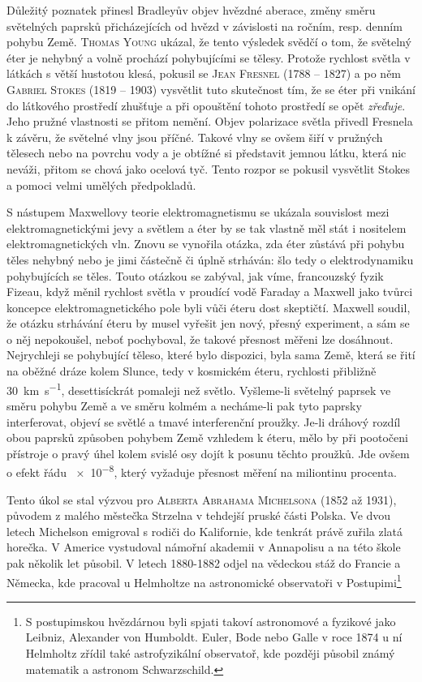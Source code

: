         Důležitý poznatek přinesl Bradleyův objev hvězdné aberace, změny směru světelných paprsků
        přicházejících od hvězd v závislosti na ročním, resp. denním pohybu Země. \textsc{Thomas
        Young} ukázal, že tento výsledek svědčí o tom, že světelný éter je nehybný a volně prochází
        pohybujícími se tělesy. Protože rychlost světla v látkách s větší hustotou klesá, pokusil se
        \textsc{Jean Fresnel} (1788 – 1827) a po něm \textsc{Gabriel Stokes} (1819 – 1903) vysvětlit
        tuto skutečnost tím, že se éter při vnikání do látkového prostředí zhušťuje a při opouštění
        tohoto prostředí se opět \emph{zřeďuje}. Jeho pružné vlastnosti se přitom nemění. Objev
        polarizace světla přivedl Fresnela k závěru, že světelné vlny jsou příčné. Takové vlny se
        ovšem šiří v pružných tělesech nebo na povrchu vody a je obtížné si představit jemnou látku,
        která nic neváži, přitom se chová jako ocelová tyč. Tento rozpor se pokusil vysvětlit Stokes
        a pomoci velmi umělých předpokladů.

      S nástupem Maxwellovy teorie elektromagnetismu se ukázala souvislost mezi elektromagnetickými
      jevy a světlem a éter by se tak vlastně měl stát i nositelem elektromagnetických vln. Znovu se
      vynořila otázka, zda éter zůstává při pohybu těles nehybný nebo je jimi částečně či úplně
      strháván: šlo tedy o elektrodynamiku pohybujících se těles. Touto otázkou se zabýval, jak
      víme, francouzský fyzik Fizeau, když měnil rychlost světla v proudící vodě Faraday a Maxwell
      jako tvůrci koncepce elektromagnetického pole byli vůči éteru dost skeptičtí. Maxwell soudil,
      že otázku strhávání éteru by musel vyřešit jen nový, přesný experiment, a sám se o něj
      nepokoušel, neboť pochyboval, že takové přesnost měřeni lze dosáhnout. Nejrychleji se
      pohybující těleso, které bylo dispozici, byla sama Země, která se řití na oběžné dráze kolem
      Slunce, tedy v kosmickém éteru, rychlosti přibližně \SI{30}{\km\per\s}, desettisíckrát
      pomaleji než světlo. Vyšleme-li světelný paprsek ve směru pohybu Země a ve směru kolmém a
      necháme-li pak tyto paprsky interferovat, objeví se světlé a tmavé interferenční proužky.
      Je-li dráhový rozdíl obou paprsků způsoben pohybem Země vzhledem k éteru, mělo by při
      pootočeni přístroje o pravý úhel kolem svislé osy dojít k posunu těchto proužků. Jde ovšem o
      efekt řádu \num{e-8}, který vyžaduje přesnost měření na miliontinu procenta. 

      Tento úkol se stal výzvou pro \textsc{Alberta Abrahama Michelsona} (1852 až 1931), původem z
      malého městečka Strzelna v tehdejší pruské části Polska. Ve dvou letech Michelson emigroval s
      rodiči do Kalifornie, kde tenkrát právě zuřila zlatá horečka. V Americe vystudoval námořní
      akademii v Annapolisu a na této škole pak několik let působil. V letech 1880-1882 odjel na
      vědeckou stáž do Francie a Německa, kde pracoval u Helmholtze na astronomické observatoři v
      Postupimi\footnote{ S postupimskou hvězdárnou byli spjati takoví astronomové a fyzikové jako
      Leibniz, Alexander von Humboldt. Euler, Bode nebo Galle v roce 1874 u ní Helmholtz zřídil také
      astrofyzikální observatoř, kde později působil známý matematik a astronom Schwarzschild.}
        
